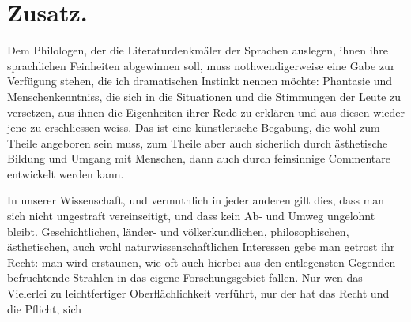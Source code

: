 \section*{Zusatz.}\label{I.V.zusatz2}

Dem Philologen, der die Literaturdenkmäler der Sprachen auslegen, ihnen ihre sprachlichen Feinheiten abgewinnen soll, muss nothwendigerweise eine Gabe zur Verfügung stehen, die ich dramatischen Instinkt nennen möchte: Phantasie und Menschenkenntniss, die sich in die Situationen und die Stimmungen der \label{sp.53} Leute zu versetzen, aus ihnen die Eigenheiten ihrer Rede zu erklären und aus diesen wieder jene zu erschliessen weiss. Das ist eine künstlerische Begabung, die wohl zum Theile angeboren sein muss, zum Theile aber auch sicherlich durch ästhetische Bildung und Umgang mit Menschen, dann auch durch feinsinnige Commentare entwickelt werden kann. 

In unserer Wissenschaft, und vermuthlich in jeder anderen gilt dies, dass man sich nicht ungestraft vereinseitigt, und dass kein Ab- und Umweg ungelohnt bleibt. Geschichtlichen, länder- und völkerkundlichen, philosophischen, ästhetischen, auch wohl naturwissenschaftlichen Interessen gebe man getrost ihr Recht: man wird erstaunen, wie oft auch hierbei aus den entlegensten Gegenden befruchtende Strahlen in das eigene Forschungsgebiet fallen. Nur wen das Vielerlei zu leichtfertiger Oberflächlichkeit verführt, nur der hat das Recht und die Pflicht, sich 

\hrulefill


